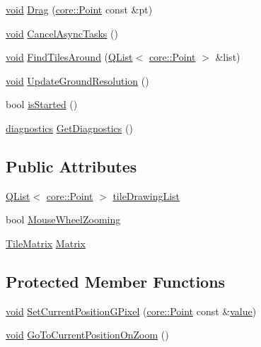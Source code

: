 \begin{DoxyCompactItemize}
\item 
\hyperlink{group___u_a_v_objects_plugin_ga444cf2ff3f0ecbe028adce838d373f5c}{void} \hyperlink{group___o_p_map_widget_gaf302579c11ad5c2448be76ada0b19bf5}{Drag} (\hyperlink{structcore_1_1_point}{core\-::\-Point} const \&pt)
\item 
\hyperlink{group___u_a_v_objects_plugin_ga444cf2ff3f0ecbe028adce838d373f5c}{void} \hyperlink{group___o_p_map_widget_gab37e2ea3b3bb0c794bb9abdf84ac5b5d}{Cancel\-Async\-Tasks} ()
\item 
\hyperlink{group___u_a_v_objects_plugin_ga444cf2ff3f0ecbe028adce838d373f5c}{void} \hyperlink{group___o_p_map_widget_ga862fd51a3d103dc955ca08f20abe57b0}{Find\-Tiles\-Around} (\hyperlink{class_q_list}{Q\-List}$<$ \hyperlink{structcore_1_1_point}{core\-::\-Point} $>$ \&list)
\item 
\hyperlink{group___u_a_v_objects_plugin_ga444cf2ff3f0ecbe028adce838d373f5c}{void} \hyperlink{group___o_p_map_widget_gaafdb82148ca58b162ba477a8e1d520c1}{Update\-Ground\-Resolution} ()
\item 
bool \hyperlink{group___o_p_map_widget_ga19e259470609023b204a70c4345ff54c}{is\-Started} ()
\item 
\hyperlink{structdiagnostics}{diagnostics} \hyperlink{group___o_p_map_widget_ga32889efb3fd780403d2005980b0a7dfc}{Get\-Diagnostics} ()
\end{DoxyCompactItemize}
\subsection*{Public Attributes}
\begin{DoxyCompactItemize}
\item 
\hyperlink{class_q_list}{Q\-List}$<$ \hyperlink{structcore_1_1_point}{core\-::\-Point} $>$ \hyperlink{group___o_p_map_widget_gaef8eae2b290cfd062061e8baaebe51d6}{tile\-Drawing\-List}
\item 
bool \hyperlink{group___o_p_map_widget_ga051b1520271b875b55fa1023041a16e6}{Mouse\-Wheel\-Zooming}
\item 
\hyperlink{classinternals_1_1_tile_matrix}{Tile\-Matrix} \hyperlink{group___o_p_map_widget_ga4ac91c5f728a51e821a9cec0abf347fd}{Matrix}
\end{DoxyCompactItemize}
\subsection*{Protected Member Functions}
\begin{DoxyCompactItemize}
\item 
\hyperlink{group___u_a_v_objects_plugin_ga444cf2ff3f0ecbe028adce838d373f5c}{void} \hyperlink{group___o_p_map_widget_ga8d0da9c286137deb71b187c5b003d968}{Set\-Current\-Position\-G\-Pixel} (\hyperlink{structcore_1_1_point}{core\-::\-Point} const \&\hyperlink{glext_8h_aa0e2e9cea7f208d28acda0480144beb0}{value})
\item 
\hyperlink{group___u_a_v_objects_plugin_ga444cf2ff3f0ecbe028adce838d373f5c}{void} \hyperlink{group___o_p_map_widget_ga65f1168da5561bfccb2ac0053f031027}{Go\-To\-Current\-Position\-On\-Zoom} ()
\end{DoxyCompactItemize}
